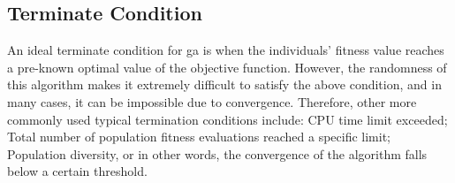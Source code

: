 \subsection {Terminate Condition}
\label{ga:terminate}
An ideal terminate condition for \gls{ga} is when the individuals' fitness value reaches a pre-known optimal value of the objective function. However, the randomness of this algorithm makes it extremely difficult to satisfy the above condition, and in many cases, it can be impossible due to convergence. Therefore, other more commonly used typical termination conditions include: CPU time limit exceeded; Total number of population fitness evaluations reached a specific limit; Population diversity, or in other words, the convergence of the algorithm falls below a certain threshold.